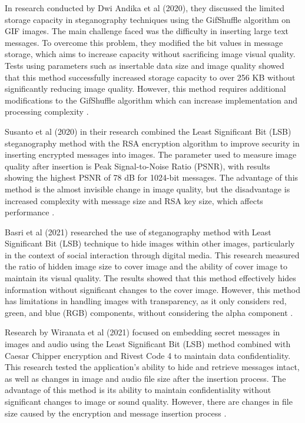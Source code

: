 \documentclass{ittelkom}
\begin{document}
In research conducted by Dwi Andika et al (2020), they discussed the limited
storage capacity in steganography techniques using the GifShuffle algorithm on
GIF images. The main challenge faced was the difficulty in inserting large text
messages. To overcome this problem, they modified the bit values in message
storage, which aims to increase capacity without sacrificing image visual
quality. Tests using parameters such as insertable data size and image quality
showed that this method successfully increased storage capacity to over 256 KB
without significantly reducing image quality. However, this method requires
additional modifications to the GifShuffle algorithm which can increase
implementation and processing complexity \cite{andika2020modifikasi}.

Susanto et al (2020) in their research combined the Least Significant Bit (LSB)
steganography method with the RSA encryption algorithm to improve security in
inserting encrypted messages into images. The parameter used to measure image
quality after insertion is Peak Signal-to-Noise Ratio (PSNR), with results
showing the highest PSNR of 78 dB for 1024-bit messages. The advantage of this
method is the almost invisible change in image quality, but the disadvantage is
increased complexity with message size and RSA key size, which affects
performance \cite{susanto2020kombinasi}.

Basri et al (2021) researched the use of steganography method with Least
Significant Bit (LSB) technique to hide images within other images,
particularly in the context of social interaction through digital media. This
research measured the ratio of hidden image size to cover image and the ability
of cover image to maintain its visual quality. The results showed that this
method effectively hides information without significant changes to the cover
image. However, this method has limitations in handling images with
transparency, as it only considers red, green, and blue (RGB) components,
without considering the alpha component \cite{basri2021penerapan}.

Research by Wiranata et al (2021) focused on embedding secret messages in
images and audio using the Least Significant Bit (LSB) method combined with
Caesar Chipper encryption and Rivest Code 4 to maintain data confidentiality.
This research tested the application's ability to hide and retrieve messages
intact, as well as changes in image and audio file size after the insertion
process. The advantage of this method is its ability to maintain
confidentiality without significant changes to image or sound quality. However,
there are changes in file size caused by the encryption and message insertion
process \cite{wiranata2021aplikasi}.
\end{document}
